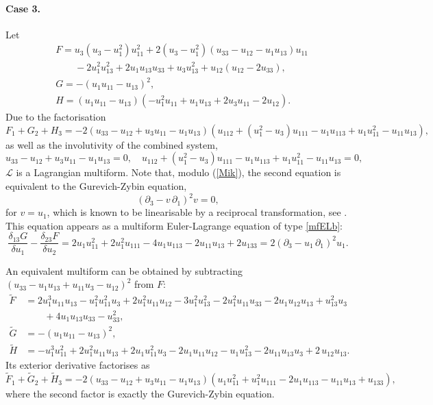 \documentclass[12pt, a4paper]{article}
\theoremstyle{definition}
\newcommand{\cL}{\mathcal{L}}
\newcommand{\var}[3]{\frac{\delta_{#1} #2}{\delta #3}}
\begin{document}
\paragraph{Case 3.} Let
\begin{align*}
&F=u_3(u_3-u_1^2)u_{11}^2+2(u_3-u_1^2)(u_{33}-u_{12}-u_1u_{13})u_{11}
\\&\qquad -2u_1^2u_{13}^2+2u_1u_{13}u_{33}+u_3u_{13}^2+u_{12}(u_{12}-2u_{33}), \\
&G=-(u_1u_{11}-u_{13})^2, \\
&H=(u_1u_{11}-u_{13})(-u_1^2u_{11}+u_1u_{13}+2u_3u_{11}-2u_{12}).
\end{align*}
Due to the factorisation
$$
F_1+G_2+H_3=-2(u_{33}-u_{12}+u_3u_{11}-u_1u_{13})(u_{112}+(u_1^2-u_3)u_{111}-u_1u_{113}+u_1u_{11}^2-u_{11}u_{13}),
$$
as well as the involutivity of  the combined system,
$$
u_{33}-u_{12}+u_3u_{11}-u_1u_{13}=0, \quad u_{112}+(u_1^2-u_3)u_{111}-u_1u_{113}+u_1u_{11}^2-u_{11}u_{13}=0,
$$
$\cL$ is a Lagrangian multiform. Note that, modulo (\ref{Mik}),  the second equation is equivalent to the Gurevich-Zybin equation, 
\[ (\partial_3-v\, \partial_1)^2v=0, \]
for $v=u_1$, which is known to be linearisable by a reciprocal transformation, see 
\cite{gurevich1988nondissipative,gurevich1995largescale,pavlov2005gurevich}.
This equation appears as a multiform Euler-Lagrange equation of type \eqref{mfELb}:
\[ \var{13}{G}{u_1} - \var{23}{F}{u_2} = 2 u_{1} u_{11}^{2} + 2 u_{1}^{2} u_{111} - 4 u_{1} u_{113} - 2 u_{11} u_{13} + 2 u_{133}
= 2 (\partial_3-u_1 \, \partial_1)^2 u_1 .
\]

An equivalent multiform can be obtained by subtracting $(u_{33} - u_1u_{13} + u_{11}u_3 - u_{12})^2$ from $F$:
\begin{align*}
\tilde F &= 2 u_{1}^{3} u_{11} u_{13} - u_{1}^{2} u_{11}^{2} u_{3} + 2 u_{1}^{2} u_{11} u_{12} - 3 u_{1}^{2} u_{13}^{2} - 2 u_{1}^{2} u_{11} u_{33} - 2 u_{1} u_{12} u_{13} + u_{13}^{2} u_{3} \\
	&\qquad + 4 u_{1} u_{13} u_{33} - u_{33}^{2},\\
	\tilde G &= - \left( u_{1}u_{11} - u_{13} \right)^2, \\
	\tilde H &= -u_{1}^{3} u_{11}^{2} + 2 u_{1}^{2} u_{11} u_{13} + 2 u_{1} u_{11}^{2} u_{3} - 2 u_{1} u_{11} u_{12} - u_{1} u_{13}^{2} - 2 u_{11} u_{13} u_{3} + 2 \, u_{12} u_{13}.
\end{align*}
Its exterior derivative factorises as
\[ \tilde F_1 + \tilde G_2 + \tilde H_3 = -2(u_{33}-u_{12}+u_3u_{11}-u_1u_{13}) (u_{1} u_{11}^{2} + u_{1}^{2} u_{111} - 2 u_{1} u_{113} - u_{11} u_{13} + u_{133} ) ,
\]
where the second factor is exactly the Gurevich-Zybin equation.
\end{document}
